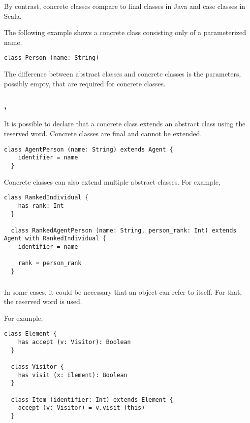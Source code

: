 By contrast, concrete classes compare to final classes in Java and case classes in Scala.

The following example shows a concrete class consisting only of a parameterized name.
\begin{lstlisting}[label={lst:exampleConcreteClass}]
  class Person (name: String)
\end{lstlisting}

The difference between abstract classes and concrete classes is the parameters, possibly empty, that are required for concrete classes.

\subsubsection{\sextends, \swith}

It is possible to declare that a concrete class extends an abstract class using the \sextends reserved word.
Concrete classes are final and cannot be extended.

\begin{lstlisting}[label={lst:exampleExtends}]
  class AgentPerson (name: String) extends Agent {
    identifier = name
  }
\end{lstlisting}

Concrete classes can also extend multiple abstract classes.
For example,
\begin{lstlisting}[label={lst:exampleWith}]
  class RankedIndividual {
    has rank: Int
  }

  class RankedAgentPerson (name: String, person_rank: Int) extends Agent with RankedIndividual {
    identifier = name

    rank = person_rank
  }
\end{lstlisting}

\subsubsection{\sthis}

In some cases, it could be necessary that an object can refer to itself.
For that, the \sthis reserved word is used.

For example,
\begin{lstlisting}[label={lst:exampleExtendsElement}]
  class Element {
    has accept (v: Visitor): Boolean
  }

  class Visitor {
    has visit (x: Element): Boolean
  }

  class Item (identifier: Int) extends Element {
    accept (v: Visitor) = v.visit (this)
  }
\end{lstlisting}


